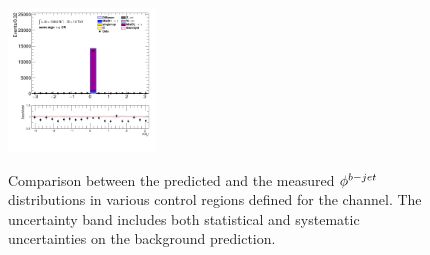 \begin{figure}[!htp]
\begin{center}
			\includegraphics[width=0.35\textwidth]{chapters/chapter6_HPlus/images/taulep/bjet_0_phi_SS_TAUMU.png} \\
			\end{center}
			\caption{
			Comparison between the predicted and the measured $\phi^{b-jet}$ distributions in various control regions defined for the \taulep channel. The uncertainty band includes both statistical and systematic uncertainties on the background prediction. 
			}
			\label{fig:bkg-phi-bjet-taulep}
		\end{figure}

